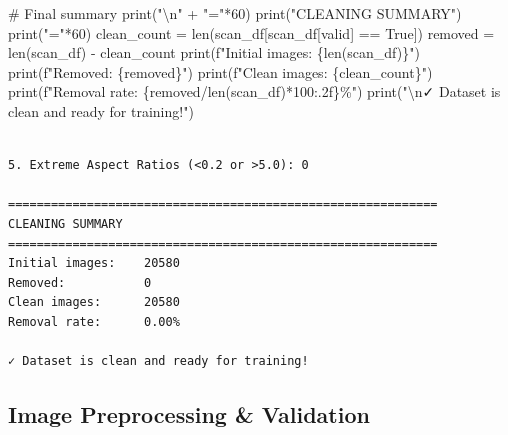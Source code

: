 \documentclass[
  letterpaper,
  DIV=11,
  numbers=noendperiod]{scrartcl}
\newenvironment{Shaded}{\begin{snugshade}}{\end{snugshade}}
\newcommand{\BuiltInTok}[1]{\textcolor[rgb]{0.00,0.23,0.31}{#1}}
\newcommand{\CharTok}[1]{\textcolor[rgb]{0.13,0.47,0.30}{#1}}
\newcommand{\CommentTok}[1]{\textcolor[rgb]{0.37,0.37,0.37}{#1}}
\newcommand{\DecValTok}[1]{\textcolor[rgb]{0.68,0.00,0.00}{#1}}
\newcommand{\NormalTok}[1]{\textcolor[rgb]{0.00,0.23,0.31}{#1}}
\newcommand{\OperatorTok}[1]{\textcolor[rgb]{0.37,0.37,0.37}{#1}}
\newcommand{\SpecialCharTok}[1]{\textcolor[rgb]{0.37,0.37,0.37}{#1}}
\newcommand{\SpecialStringTok}[1]{\textcolor[rgb]{0.13,0.47,0.30}{#1}}
\newcommand{\StringTok}[1]{\textcolor[rgb]{0.13,0.47,0.30}{#1}}
\newcommand{\VariableTok}[1]{\textcolor[rgb]{0.07,0.07,0.07}{#1}}
\renewenvironment{Shaded}{%
  \begin{tcolorbox}[%
    enhanced,%
    colback=codebg,%
    colframe=codebg,%
    borderline west={3pt}{0pt}{sectionblue},%
    boxrule=0pt,%
    arc=0pt,%
    boxsep=5pt,%
    left=2mm,%
    right=2mm,%
    top=2mm,%
    bottom=2mm%
  ]%
}{%
  \end{tcolorbox}%
}
\begin{document}
\begin{Shaded}
\begin{Highlighting}[]
\CommentTok{\# Final summary}
\BuiltInTok{print}\NormalTok{(}\StringTok{"}\CharTok{\textbackslash{}n}\StringTok{"} \OperatorTok{+} \StringTok{"="}\OperatorTok{*}\DecValTok{60}\NormalTok{)}
\BuiltInTok{print}\NormalTok{(}\StringTok{"CLEANING SUMMARY"}\NormalTok{)}
\BuiltInTok{print}\NormalTok{(}\StringTok{"="}\OperatorTok{*}\DecValTok{60}\NormalTok{)}
\NormalTok{clean\_count }\OperatorTok{=} \BuiltInTok{len}\NormalTok{(scan\_df[scan\_df[}\StringTok{\textquotesingle{}valid\textquotesingle{}}\NormalTok{] }\OperatorTok{==} \VariableTok{True}\NormalTok{])}
\NormalTok{removed }\OperatorTok{=} \BuiltInTok{len}\NormalTok{(scan\_df) }\OperatorTok{{-}}\NormalTok{ clean\_count}
\BuiltInTok{print}\NormalTok{(}\SpecialStringTok{f"Initial images:    }\SpecialCharTok{\{}\BuiltInTok{len}\NormalTok{(scan\_df)}\SpecialCharTok{\}}\SpecialStringTok{"}\NormalTok{)}
\BuiltInTok{print}\NormalTok{(}\SpecialStringTok{f"Removed:           }\SpecialCharTok{\{}\NormalTok{removed}\SpecialCharTok{\}}\SpecialStringTok{"}\NormalTok{)}
\BuiltInTok{print}\NormalTok{(}\SpecialStringTok{f"Clean images:      }\SpecialCharTok{\{}\NormalTok{clean\_count}\SpecialCharTok{\}}\SpecialStringTok{"}\NormalTok{)}
\BuiltInTok{print}\NormalTok{(}\SpecialStringTok{f"Removal rate:      }\SpecialCharTok{\{}\NormalTok{removed}\OperatorTok{/}\BuiltInTok{len}\NormalTok{(scan\_df)}\OperatorTok{*}\DecValTok{100}\SpecialCharTok{:.2f\}}\SpecialStringTok{\%"}\NormalTok{)}
\BuiltInTok{print}\NormalTok{(}\StringTok{"}\CharTok{\textbackslash{}n}\StringTok{✓ Dataset is clean and ready for training!"}\NormalTok{)}
\end{Highlighting}
\end{Shaded}

\begin{verbatim}

5. Extreme Aspect Ratios (<0.2 or >5.0): 0

============================================================
CLEANING SUMMARY
============================================================
Initial images:    20580
Removed:           0
Clean images:      20580
Removal rate:      0.00%

✓ Dataset is clean and ready for training!
\end{verbatim}

\subsection{Image Preprocessing \&
Validation}\label{image-preprocessing-validation}
\end{document}
